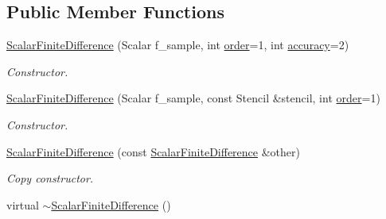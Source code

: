 \subsection*{Public Member Functions}
\begin{DoxyCompactItemize}
\item 
\hyperlink{classow__core_1_1ScalarFiniteDifference_adb0ef73ee504f1fa4fa1482e246ab087}{Scalar\+Finite\+Difference} (Scalar f\+\_\+sample, int \hyperlink{classow__core_1_1ScalarFiniteDifference_abd716b78f9efb2a0e681ab81b75af343}{order}=1, int \hyperlink{classow__core_1_1ScalarFiniteDifference_a502aa6a61c73529e731be0a0096414fd}{accuracy}=2)
\begin{DoxyCompactList}\small\item\em Constructor. \end{DoxyCompactList}\item 
\hyperlink{classow__core_1_1ScalarFiniteDifference_a96309a3bbefe35413bbae0f00b3086c1}{Scalar\+Finite\+Difference} (Scalar f\+\_\+sample, const Stencil \&stencil, int \hyperlink{classow__core_1_1ScalarFiniteDifference_abd716b78f9efb2a0e681ab81b75af343}{order}=1)
\begin{DoxyCompactList}\small\item\em Constructor. \end{DoxyCompactList}\item 
\hyperlink{classow__core_1_1ScalarFiniteDifference_a2340ba423879653eecda4014b3b801ce}{Scalar\+Finite\+Difference} (const \hyperlink{classow__core_1_1ScalarFiniteDifference}{Scalar\+Finite\+Difference} \&other)\hypertarget{classow__core_1_1ScalarFiniteDifference_a2340ba423879653eecda4014b3b801ce}{}\label{classow__core_1_1ScalarFiniteDifference_a2340ba423879653eecda4014b3b801ce}

\begin{DoxyCompactList}\small\item\em Copy constructor. \end{DoxyCompactList}\item 
virtual \hyperlink{classow__core_1_1ScalarFiniteDifference_a1a9d9cf7bdadde26c0d7fe0a29601518}{$\sim$\+Scalar\+Finite\+Difference} ()\hypertarget{classow__core_1_1ScalarFiniteDifference_a1a9d9cf7bdadde26c0d7fe0a29601518}{}\label{classow__core_1_1ScalarFiniteDifference_a1a9d9cf7bdadde26c0d7fe0a29601518}


\end{DoxyCompactItemize}
